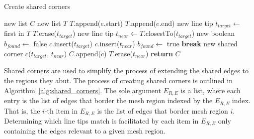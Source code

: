 \begin{algorithm}[!b]
	\caption{Create shared corners}\label{alg:shared_corners}
\begin{algorithmic}[1]
	\State new list $C$ 
		\State new list $T$ 
			\State $T$.append($e$.start)
			\State $T$.append($e$.end)
		\EndFor
			\State new line tip $t_{target} \leftarrow$ first in $T$
			\State $T$.erase($t_{target}$)
			\State new line tip $t_{near} \leftarrow T$.closestTo($t_{target}$)
			\State new boolean $b_{found} \leftarrow$ false
					\State $c$.insert($t_{target}$)
					\State $c$.insert($t_{near}$)
					\State $b_{found} \leftarrow$ true
					\State \textbf{break}
				\EndIf
			\EndFor
				\State new shared corner $c$($t_{target}$, $t_{near}$)
				\State $C$.append($c$)
			\EndIf
			\State $T$.erase($t_{near}$)
		\EndWhile
	\EndFor
	\State \textbf{return} $C$
\EndFunction
\end{algorithmic}
\end{algorithm}

Shared corners are used to simplify the process of extending the shared edges to the regions they abut.
The process of creating shared corners is outlined in Algorithm~\ref{alg:shared_corners}.
The sole argument $E_{R,E}$ is a list, where each entry is the list of edges that border the mesh region indexed by the $E_{R,E}$ index.
That is, the $i$-th item in $E_{R,E}$ is the list of edges that border mesh region $i$.
Determining which line tips match is facilitated by each item in $E_{R,E}$ only containing the edges relevant to a given mesh region.

